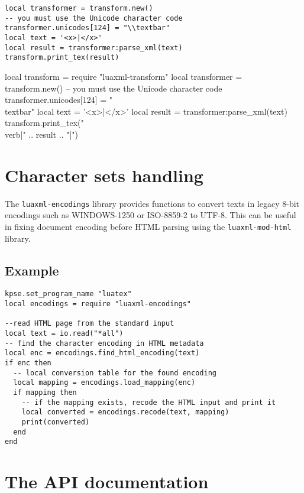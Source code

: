 \documentclass{ltxdoc}
\begin{document}
\begin{verbatim}
local transformer = transform.new()
-- you must use the Unicode character code
transformer.unicodes[124] = "\\textbar"
local text = '<x>|</x>'
local result = transformer:parse_xml(text)
transform.print_tex(result)
\end{verbatim}

\begin{framed}
\begin{luacode*}
local transform = require "luaxml-transform"
local transformer = transform.new()
-- you must use the Unicode character code
transformer.unicodes[124] = "\\textbar"
local text = '<x>|</x>'
local result = transformer:parse_xml(text)
transform.print_tex("\\verb|" .. result .. "|")
\end{luacode*}
\end{framed}

\section{Character sets handling}

The \texttt{luaxml-encodings} library provides functions to convert texts in legacy 8-bit encodings such as WINDOWS-1250 
or ISO-8859-2 to UTF-8. This can be useful in fixing document encoding before HTML parsing using the \texttt{luaxml-mod-html}
library. 

\subsection{Example}


\begin{verbatim}
kpse.set_program_name "luatex"
local encodings = require "luaxml-encodings"

--read HTML page from the standard input
local text = io.read("*all")
-- find the character encoding in HTML metadata
local enc = encodings.find_html_encoding(text)
if enc then
  -- local conversion table for the found encoding
  local mapping = encodings.load_mapping(enc)
  if mapping then
    -- if the mapping exists, recode the HTML input and print it
    local converted = encodings.recode(text, mapping)
    print(converted)
  end
end
\end{verbatim}



\section{The API documentation}
\end{document}

